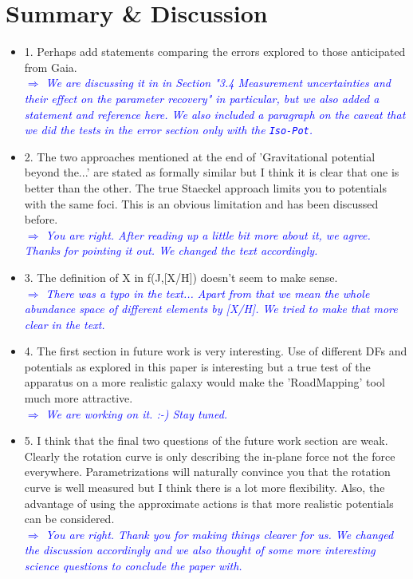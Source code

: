 \documentclass[10pt,a4paper]{article}
\newcommand{\Comment}[1]{\textsl{\textcolor{Blue}{$\Longrightarrow$ {#1}}}}
\begin{document}
\section{Summary \& Discussion}
\begin{itemize}
\item 1. Perhaps add statements comparing the errors explored to those anticipated from Gaia. \\\Comment{We are discussing it in in Section "3.4 Measurement uncertainties and their effect on the parameter recovery" in particular, but we also added a statement and reference here. We also included a paragraph on the caveat that we did the tests in the error section only with the \texttt{Iso-Pot}.}
\item 2. The two approaches mentioned at the end of 'Gravitational potential beyond the...' are stated as formally similar but I think it is clear that one is better than the other. The true Staeckel approach limits you to potentials with the same foci. This is an obvious limitation and has been discussed before. \\\Comment{You are right. After reading up a little bit more about it, we agree. Thanks for pointing it out. We changed the text accordingly.}
\item 3. The definition of X in f(J,[X/H]) doesn't seem to make sense. \\\Comment{There was a typo in the text... Apart from that we mean the whole abundance space of different elements by [X/H]. We tried to make that more clear in the text.}
\item 4. The first section in future work is very interesting. Use of different DFs and potentials as explored in this paper is interesting but a true test of the apparatus on a more realistic galaxy would make the 'RoadMapping' tool much more attractive. \\\Comment{We are working on it. :-) Stay tuned.}
\item 5. I think that the final two questions of the future work section are weak. Clearly the rotation curve is only describing the in-plane force not the force everywhere. Parametrizations will naturally convince you that the rotation curve is well measured but I think there is a lot more flexibility. Also, the advantage of using the approximate actions is that more realistic potentials can be considered. \\\Comment{You are right. Thank you for making things clearer for us. We changed the discussion accordingly and we also thought of some more interesting science questions to conclude the paper with.}

\end{itemize}
\end{document}

